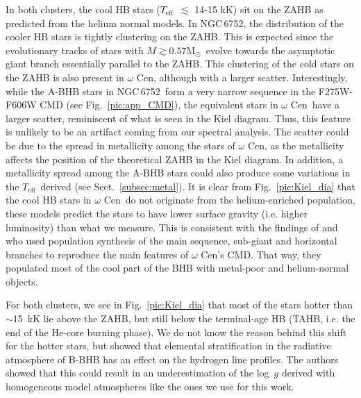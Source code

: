 \documentclass{aa}
\newcommand{\msun}{$\text{M}_\odot$}
\newcommand{\teff}{$T_{\text{eff}}$}
\newcommand{\Cen}{$\omega$ Cen}
\newcommand{\ngc}{NGC\,6752}
\begin{document}
In both clusters, the cool HB stars (\teff\ $\lesssim$ 14-15 kK) sit on the ZAHB as predicted from the helium normal models. 
In \ngc, the distribution of the cooler HB stars is tightly clustering on the ZAHB. This is expected since the evolutionary tracks of stars with $M \gtrsim 0.57$\msun\ evolve towards the asymptotic giant branch essentially parallel to the ZAHB. 
This clustering of the cold stars on the ZAHB is also present in \Cen, although with a larger scatter. Interestingly, while the A-BHB stars in \ngc\ form a very narrow sequence in the F275W-F606W CMD (see Fig.~\ref{pic:app_CMD}), the equivalent stars in \Cen\ have a larger scatter, reminiscent of what is seen in the Kiel diagram. Thus, this feature is unlikely to be an artifact coming from our spectral analysis. The scatter could be due to the spread in metallicity among the stars of \Cen, as the metallicity affects the position of the theoretical ZAHB in the Kiel diagram. In addition, a metallicity spread among the A-BHB stars could also produce some variations in the \teff\ derived (see Sect.~\ref{subsec:metal}).
It is clear from Fig.~\ref{pic:Kiel_dia} that the cool HB stars in \Cen\ do not originate from the helium-enriched population, these models predict the stars to have lower surface gravity (i.e. higher luminosity) than what we measure. This is consistent with the findings of \citet{Joo2013} and \citet{tailo2016} who used population synthesis of the main sequence, sub-giant and horizontal branches to reproduce the main features of \Cen's CMD. That way, they populated most of the cool part of the BHB with metal-poor and helium-normal objects. 

For both clusters, we see in Fig.~\ref{pic:Kiel_dia} that most of the stars hotter than $\sim$15~kK lie above the ZAHB, but still below the terminal-age HB (TAHB, i.e. the end of the He-core burning phase).
We do not know the reason behind this shift for the hotter stars, but \citet{leblanc2010} showed that elemental stratification in the radiative atmosphere of B-BHB has an effect on the hydrogen line profiles. The authors showed that this could result in an underestimation of the log~$g$ derived with homogeneous model atmospheres like the ones we use for this work.
\end{document}
